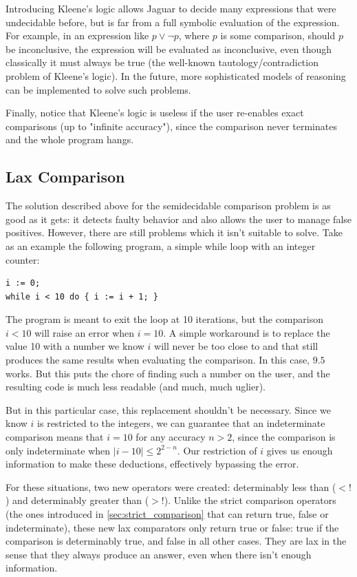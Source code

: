 Introducing Kleene's logic allows Jaguar to decide many expressions that were undecidable before, but is far from a full symbolic evaluation of the expression. For example, in an expression like $p \vee \neg p$, where $p$ is some comparison, should $p$ be inconclusive, the expression will be evaluated as inconclusive, even though classically it must always be true (the well-known tautology/contradiction problem of Kleene's logic). In the future, more sophisticated models of reasoning can be implemented to solve such problems.

Finally, notice that Kleene's logic is useless if the user re-enables exact comparisons (up to "infinite accuracy"), since the comparison never terminates and the whole program hangs.

\subsection{Lax Comparison}

The solution described above for the semidecidable comparison problem is as good as it gets: it detects faulty behavior and also allows the user to manage false positives. However, there are still problems which it isn't suitable to solve. Take as an example the following program, a simple while loop with an integer counter:

\begin{lstlisting}[caption=Simple "for" loop with an integer counter variable]
i := 0;
while i < 10 do { i := i + 1; }
\end{lstlisting}

The program is meant to exit the loop at 10 iterations, but the comparison $i < 10$ will raise an error when $i = 10$. A simple workaround is to replace the value 10 with a number we know $i$ will never be too close to and that still produces the same results when evaluating the comparison. In this case, $9.5$ works. But this puts the chore of finding such a number on the user, and the resulting code is much less readable (and much, much uglier).

But in this particular case, this replacement shouldn't be necessary. Since we know $i$ is restricted to the integers, we can guarantee that an indeterminate comparison means that $i=10$ for any accuracy $n>2$, since the comparison is only indeterminate when $|i-10| \leq 2^{2-n}$. Our restriction of $i$ gives us enough information to make these deductions, effectively bypassing the error.

For these situations, two new operators were created: determinably less than ($<!$) and determinably greater than ($>!$). Unlike the strict comparison operators (the ones introduced in \cref{sec:strict_comparison} that can return true, false or indeterminate), these new lax comparators only return true or false: true if the comparison is determinably true, and false in all other cases. They are lax in the sense that they always produce an answer, even when there isn't enough information.

